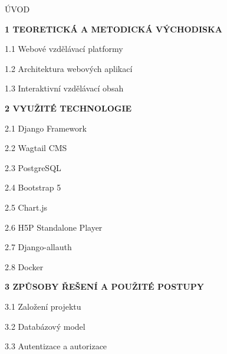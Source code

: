 \documentclass[a4paper,12pt]{article}
\begin{document}
\vspace{1cm}

\noindent
ÚVOD 

\vspace{0.5cm}

\noindent
\textbf{1 TEORETICKÁ A METODICKÁ VÝCHODISKA} 

\noindent
\hspace{0.5cm} 1.1 Webové vzdělávací platformy 

\noindent
\hspace{0.5cm} 1.2 Architektura webových aplikací 

\noindent
\hspace{0.5cm} 1.3 Interaktivní vzdělávací obsah 

\vspace{0.5cm}

\noindent
\textbf{2 VYUŽITÉ TECHNOLOGIE} 

\noindent
\hspace{0.5cm} 2.1 Django Framework 

\noindent
\hspace{0.5cm} 2.2 Wagtail CMS 

\noindent
\hspace{0.5cm} 2.3 PostgreSQL 

\noindent
\hspace{0.5cm} 2.4 Bootstrap 5 

\noindent
\hspace{0.5cm} 2.5 Chart.js 

\noindent
\hspace{0.5cm} 2.6 H5P Standalone Player 

\noindent
\hspace{0.5cm} 2.7 Django-allauth 

\noindent
\hspace{0.5cm} 2.8 Docker 

\vspace{0.5cm}

\noindent
\textbf{3 ZPŮSOBY ŘEŠENÍ A POUŽITÉ POSTUPY} 

\noindent
\hspace{0.5cm} 3.1 Založení projektu 

\noindent
\hspace{0.5cm} 3.2 Databázový model 

\noindent
\hspace{0.5cm} 3.3 Autentizace a autorizace 
\end{document}
